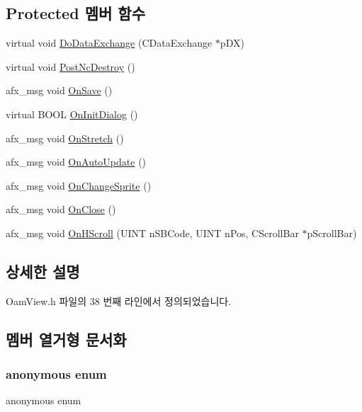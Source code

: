 \subsection*{Protected 멤버 함수}
\begin{DoxyCompactItemize}
\item 
virtual void \mbox{\hyperlink{class_oam_view_a0f3152b720294d92994d5240523fa64e}{Do\+Data\+Exchange}} (C\+Data\+Exchange $\ast$p\+DX)
\item 
virtual void \mbox{\hyperlink{class_oam_view_ade58501064b40396703757df105b944b}{Post\+Nc\+Destroy}} ()
\item 
afx\+\_\+msg void \mbox{\hyperlink{class_oam_view_adb535d2f90a5c8edce8cb900e64a5854}{On\+Save}} ()
\item 
virtual B\+O\+OL \mbox{\hyperlink{class_oam_view_a925c72977181efd7be81b302af7ed071}{On\+Init\+Dialog}} ()
\item 
afx\+\_\+msg void \mbox{\hyperlink{class_oam_view_a60c3ddf70e740451daa8bb8a76661667}{On\+Stretch}} ()
\item 
afx\+\_\+msg void \mbox{\hyperlink{class_oam_view_a5c3407e6ff2ffc673ea913d19883a4c8}{On\+Auto\+Update}} ()
\item 
afx\+\_\+msg void \mbox{\hyperlink{class_oam_view_abe95dd5fc8a624b1ae5b3e4f4deb304a}{On\+Change\+Sprite}} ()
\item 
afx\+\_\+msg void \mbox{\hyperlink{class_oam_view_aa09ba3520dcfe8357764cbbd170e7c9c}{On\+Close}} ()
\item 
afx\+\_\+msg void \mbox{\hyperlink{class_oam_view_abe18288bced0938ce18be385de441bd4}{On\+H\+Scroll}} (U\+I\+NT n\+S\+B\+Code, U\+I\+NT n\+Pos, C\+Scroll\+Bar $\ast$p\+Scroll\+Bar)
\end{DoxyCompactItemize}


\subsection{상세한 설명}


Oam\+View.\+h 파일의 38 번째 라인에서 정의되었습니다.



\subsection{멤버 열거형 문서화}
\mbox{\label{class_oam_view_ac29ce9205f4917f10053370f06262098}} 
\subsubsection{\texorpdfstring{anonymous enum}{anonymous enum}}
{\footnotesize\ttfamily anonymous enum}

